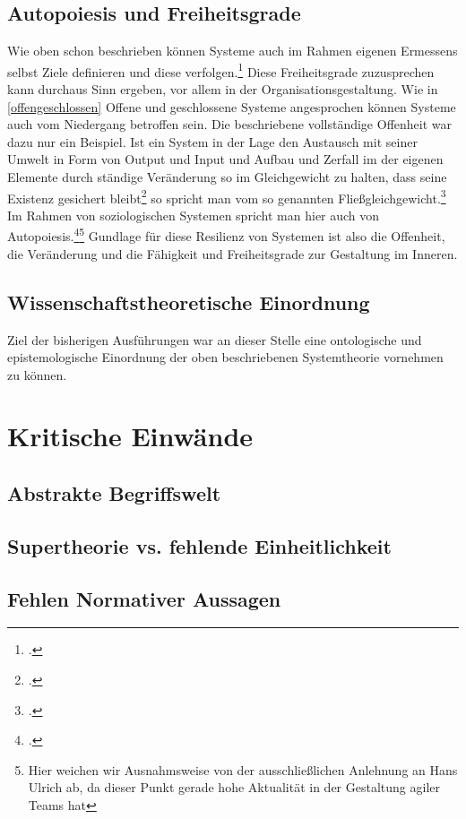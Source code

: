 \documentclass[a4paper,12pt]{article}
\begin{document}
\subsection{Autopoiesis und Freiheitsgrade}
Wie oben schon beschrieben können Systeme auch im Rahmen eigenen Ermessens selbst Ziele definieren und diese verfolgen.\footcite[S. 114]{Ulrich1968} Diese Freiheitsgrade zuzusprechen kann durchaus Sinn ergeben, vor allem in der Organisationsgestaltung. Wie in \ref{offengeschlossen} Offene und geschlossene Systeme angesprochen können Systeme auch vom Niedergang betroffen sein. Die beschriebene vollständige Offenheit war dazu nur ein Beispiel. Ist ein System in der Lage den Austausch mit seiner Umwelt in Form von Output und Input und Aufbau und Zerfall im der eigenen Elemente durch ständige Veränderung so im Gleichgewicht zu halten, dass seine Existenz gesichert bleibt\footcite[S. 113]{Ulrich1968} so spricht man vom so genannten Fließgleichgewicht.\footcite[86]{Diesner2015} Im Rahmen von soziologischen Systemen spricht man hier auch von Autopoiesis.\footcite[S. 63]{Willke2006}\footnote{Hier weichen wir Ausnahmsweise von der ausschließlichen Anlehnung an Hans Ulrich ab, da dieser Punkt gerade hohe Aktualität in der Gestaltung agiler Teams hat} Gundlage für diese Resilienz von Systemen ist also die Offenheit, die Veränderung und die Fähigkeit und Freiheitsgrade zur Gestaltung im Inneren.
 

\subsection{Wissenschaftstheoretische Einordnung}
Ziel der bisherigen Ausführungen war an dieser Stelle eine ontologische und epistemologische Einordnung der oben beschriebenen Systemtheorie vornehmen zu können. 
\section{Kritische Einwände}
\subsection{Abstrakte Begriffswelt}
\subsection{Supertheorie vs. fehlende Einheitlichkeit}
\subsection{Fehlen Normativer Aussagen}
\end{document}
